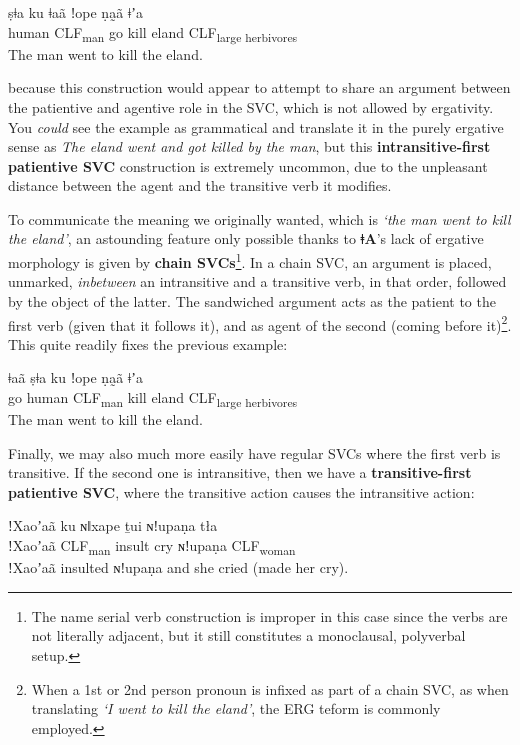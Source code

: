 \documentclass[11pt,a5paper]{book}
\newcommand{\qcn}[1]{\textcolor{AccentText}{\large\textbf{#1}}}
\newcommand{\langname}{\qcn{ǂA}}
\newcommand{\transl}[2]{\qcn{#1} \emph{#2}}
\newcommand{\grammsc}[1]{\textsc{#1}}
\newcommand{\CLF}[1]{\grammsc{CLF}\textsubscript{#1}}
\newcommand{\ERG}{\grammsc{ERG}}
\begin{document}
\begin{exe}
\ex
\gll *ṣǂa ku ǂaã ǃope ṇa̰ã ǂʼa \\
human \CLF{man} go kill eland \CLF{large herbivores}\\
\glt *The man went to kill the eland.
\end{exe}

because this construction would appear to attempt to share an argument between the patientive and agentive role in the SVC, which is not allowed by ergativity. You \emph{could} see the example as grammatical and translate it in the purely ergative sense as \transl{}{The eland went and got killed by the man}, but this \textbf{intransitive-first patientive SVC} construction is extremely uncommon, due to the unpleasant distance between the agent and the transitive verb it modifies. 

To communicate the meaning we originally wanted, which is \emph{`the man went to kill the eland'}, an astounding feature only possible thanks to \langname{}'s lack of ergative morphology is given by \textbf{chain SVCs}\footnote{The name serial verb construction is improper in this case since the verbs are not literally adjacent, but it still constitutes a monoclausal, polyverbal setup.}. In a chain SVC, an argument is placed, unmarked, \emph{inbetween} an intransitive and a transitive verb, in that order, followed by the object of the latter. The sandwiched argument acts as the patient to the first verb (given that it follows it), and as agent of the second (coming before it)\footnote{When a 1st or 2nd person pronoun is infixed as part of a chain SVC, as when translating \emph{`I went to kill the eland'}, the \ERG{} teform is commonly employed.}. This quite readily fixes the previous example:

\begin{exe}
\ex
\gll ǂaã ṣǂa ku  ǃope ṇa̰ã ǂʼa \\
go human \CLF{man} kill eland \CLF{large herbivores}\\
\glt The man went to kill the eland.
\end{exe}

Finally, we may also much more easily have regular SVCs where the first verb is transitive. If the second one is intransitive, then we have a \textbf{transitive-first patientive SVC}, where the transitive action causes the intransitive action:

\begin{exe}
\ex
\gll ǃXaoʼaã ku ɴǁxape ṯui ɴǃupaṇa  tła\\
ǃXaoʼaã \CLF{man} insult cry ɴǃupaṇa \CLF{woman}\\
\glt ǃXaoʼaã insulted ɴǃupaṇa and she cried (made her cry).
\end{exe}
\end{document}

